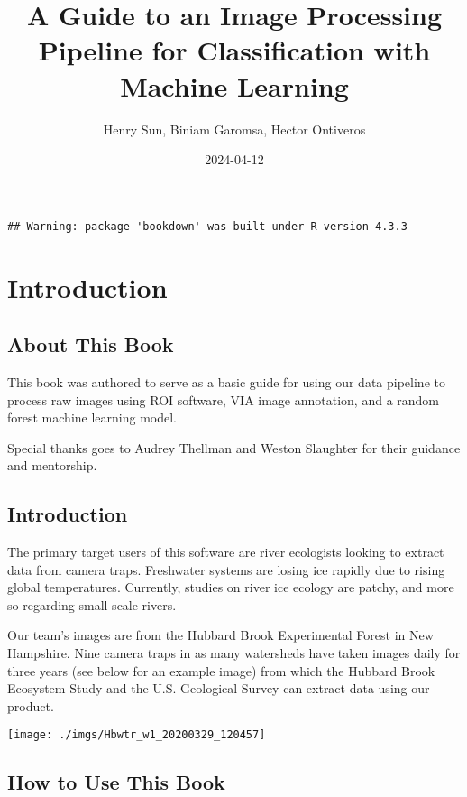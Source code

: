 \documentclass[
]{article}
\title{A Guide to an Image Processing Pipeline for Classification with Machine Learning}
\author{Henry Sun, Biniam Garomsa, Hector Ontiveros}
\date{2024-04-12}
\begin{document}
\maketitle

{
\setcounter{tocdepth}{2}
\tableofcontents
}
\begin{verbatim}
## Warning: package 'bookdown' was built under R version 4.3.3
\end{verbatim}

\hypertarget{introduction}{%
\section{Introduction}\label{introduction}}

\hypertarget{about-this-book}{%
\subsection{About This Book}\label{about-this-book}}

This book was authored to serve as a basic guide for using our data pipeline to
process raw images using ROI software, VIA image annotation, and a random forest machine
learning model.

Special thanks goes to Audrey Thellman and Weston Slaughter for their guidance and
mentorship.

\hypertarget{introduction-1}{%
\subsection{Introduction}\label{introduction-1}}

The primary target users of this software are river ecologists looking to extract data from camera traps. Freshwater systems are losing ice rapidly due to rising global temperatures. Currently, studies on river ice ecology are patchy, and more so regarding small-scale rivers.

Our team's images are from the Hubbard Brook Experimental Forest in New Hampshire. Nine camera traps in as many watersheds have taken images daily for three years (see below for an example image) from which the Hubbard Brook Ecosystem Study and the U.S. Geological Survey can extract data using our product.

\texttt{[image: ./imgs/Hbwtr\_w1\_20200329\_120457]}

\hypertarget{how-to-use-this-book}{%
\subsection{How to Use This Book}\label{how-to-use-this-book}}
\end{document}

